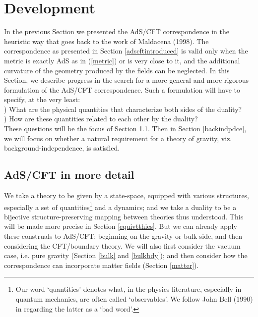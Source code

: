 \documentclass[12pt]{article}
\renewcommand{\^}[1]{\hat{#1}}
\newcommand{\eq}[1]{(\ref{#1})}
\begin{document}


\section{Development}\label{dict}

In the previous Section we presented the AdS/CFT correspondence in the heuristic way that goes back to the work of Maldacena (1998). The correspondence as presented in Section \ref{adscftintroduced} is valid only when the metric is exactly AdS as in \eq{metric} or is very close to it, and the additional curvature of the geometry produced by the fields can be neglected. In this Section, we describe progress in the search for a more general and more rigorous formulation of the AdS/CFT correspondence. Such a formulation will have to specify, at the very least:\\
) What are the physical quantities that characterize both sides of the duality? \\
) How are these quantities related to each other by the duality? \\
These questions will be the focus of Section \ref{dictionary}. Then in Section \ref{backindpdce}, we will focus on whether a natural requirement for a theory of gravity, viz. background-independence, is satisfied.

\subsection{AdS/CFT in more detail}\label{dictionary}

We take a theory to be given by a state-space, equipped with various structures, especially a set of quantities\footnote{Our word `quantities' denotes what, in the physics literature, especially in quantum mechanics, are often called `observables'. We follow John Bell (1990) in regarding the latter as a `bad word'.} and a dynamics; and we take a duality to be a bijective structure-preserving mapping between  theories thus understood. This will be made more precise in Section \ref{equivtthies}. But we can already apply these construals to  AdS/CFT: beginning on the gravity or bulk side, and then considering the CFT/boundary theory. We will also first consider the vacuum case, i.e. pure gravity (Section \ref{bulk} and \ref{bulkbdy}); and then consider how the correspondence can incorporate matter fields (Section \ref{matter}).
\end{document}
